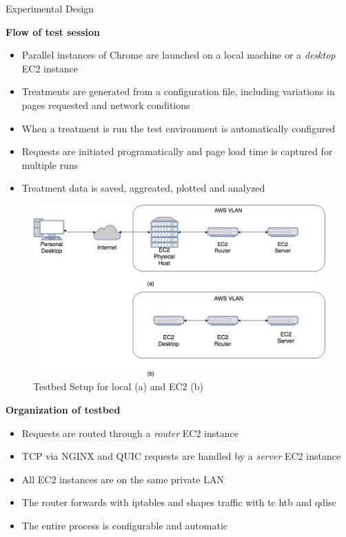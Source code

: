 \documentclass[final]{beamer}
\newlength{\onecolwid}
\begin{document}
\begin{frame}[t]
\begin{columns}[t]
\begin{column}{\onecolwid}
\begin{block}{Experimental Design}

\textbf{Flow of test session}

\begin{itemize}
	\item Parallel instances of Chrome are launched on a local machine or a \textit{desktop} EC2 instance
	\item Treatments are generated from a configuration file, including variations in pages requested and network conditions
	\item When a treatment is run the test environment is automatically configured
	\item Requests are initiated programatically and page load time is captured for multiple runs
	\item Treatment data is saved, aggreated, plotted and analyzed
\end{itemize}

\begin{figure}
\includegraphics[width=0.8\linewidth]{images/network_diagram.png}
\caption{Testbed Setup for local (a) and EC2 (b)}
\end{figure}

\textbf{Organization of testbed}

\begin{itemize}
	\item Requests are routed through a \textit{router} EC2 instance
	\item TCP via NGINX and QUIC requests are handled by a \textit{server} EC2 instance
	\item All EC2 instances are on the same private LAN
	\item The router forwards with iptables and shapes traffic with tc htb and qdisc
	\item The entire process is configurable and automatic	
\end{itemize}


\end{block}
\end{column}
\end{columns}
\end{frame}
\end{document}
